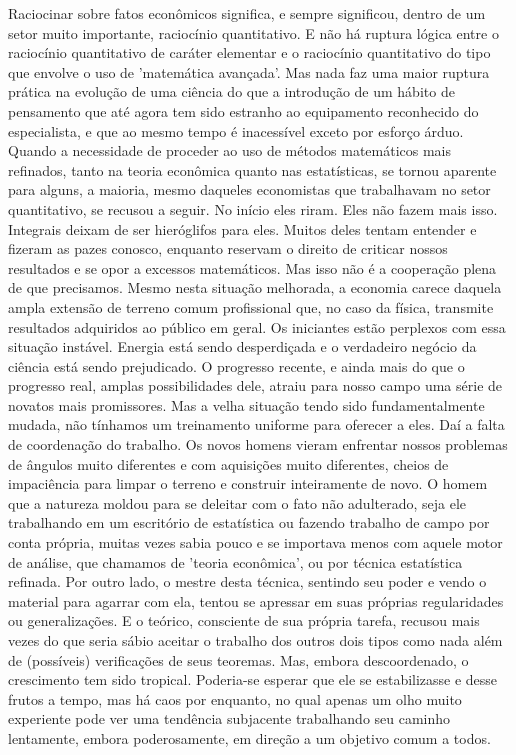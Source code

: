 \documentclass[12pt]{article}
\begin{document}
Raciocinar sobre fatos econômicos significa, e sempre significou, dentro de um setor muito importante, raciocínio quantitativo. E não há ruptura lógica entre o raciocínio quantitativo de caráter elementar e o raciocínio quantitativo do tipo que envolve o uso de 'matemática avançada'. Mas nada faz uma maior ruptura prática na evolução de uma ciência do que a introdução de um hábito de pensamento que até agora tem sido estranho ao equipamento reconhecido do especialista, e que ao mesmo tempo é inacessível exceto por esforço árduo. Quando a necessidade de proceder ao uso de métodos matemáticos mais refinados, tanto na teoria econômica quanto nas estatísticas, se tornou aparente para alguns, a maioria, mesmo daqueles economistas que trabalhavam no setor quantitativo, se recusou a seguir. No início eles riram. Eles não fazem mais isso. Integrais deixam de ser hieróglifos para eles. Muitos deles tentam entender e fizeram as pazes conosco, enquanto reservam o direito de criticar nossos resultados e se opor a excessos matemáticos. Mas isso não é a cooperação plena de que precisamos. Mesmo nesta situação melhorada, a economia carece daquela ampla extensão de terreno comum profissional que, no caso da física, transmite resultados adquiridos ao público em geral. Os iniciantes estão perplexos com essa situação instável. Energia está sendo desperdiçada e o verdadeiro negócio da ciência está sendo prejudicado. O progresso recente, e ainda mais do que o progresso real, amplas possibilidades dele, atraiu para nosso campo uma série de novatos mais promissores. Mas a velha situação tendo sido fundamentalmente mudada, não tínhamos um treinamento uniforme para oferecer a eles. Daí a falta de coordenação do trabalho. Os novos homens vieram enfrentar nossos problemas de ângulos muito diferentes e com aquisições muito diferentes, cheios de impaciência para limpar o terreno e construir inteiramente de novo. O homem que a natureza moldou para se deleitar com o fato não adulterado, seja ele trabalhando em um escritório de estatística ou fazendo trabalho de campo por conta própria, muitas vezes sabia pouco e se importava menos com aquele motor de análise, que chamamos de 'teoria econômica', ou por técnica estatística refinada. Por outro lado, o mestre desta técnica, sentindo seu poder e vendo o material para agarrar com ela, tentou se apressar em suas próprias regularidades ou generalizações. E o teórico, consciente de sua própria tarefa, recusou mais vezes do que seria sábio aceitar o trabalho dos outros dois tipos como nada além de (possíveis) verificações de seus teoremas. Mas, embora descoordenado, o crescimento tem sido tropical. Poderia-se esperar que ele se estabilizasse e desse frutos a tempo, mas há caos por enquanto, no qual apenas um olho muito experiente pode ver uma tendência subjacente trabalhando seu caminho lentamente, embora poderosamente, em direção a um objetivo comum a todos.
\end{document}
